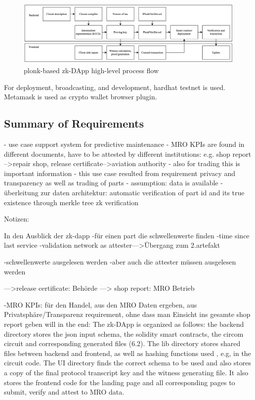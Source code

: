 \begin{figure}[hbt]
	\centering
		\includegraphics[width=1.0\textwidth]{Pictures/circom snarkj plonk process flow.png}
	\caption{plonk-based zk-DApp high-level process flow}
	\label{fig:zk-DAppgeneral}
\end{figure}

For deployment, broadcasting, and development, hardhat testnet is used. Metamask is used as crypto wallet browser plugin.

\subsection{Summary of Requirements}
- use case support system for predictive maintenance
- MRO KPIs are found in different documents, have to be attested by different institutions: e.g. shop report -->repair shop, release certificate-->aviation authority
- also for trading this is important information 
- this use case resulted from requirement privacy and transparency as well as trading of parts
- assumption: data is available
- überleitung zur daten architektur: automatic verification of part id and its true existence through merkle tree zk verification

Notizen:

In den Ausblick der zk-dapp
-für einen part die schwellenwerte finden
-time since last service
-validation network as attester—>Übergang zum 2.artefakt 

-schwellenwerte ausgelesen werden
-aber auch die attester müssen ausgelesen werden

—>release certificate: Behörde
—> shop report: MRO Betrieb

-MRO KPIs: für den Handel, aus den MRO Daten ergeben, aus Privatsphäre/Transparenz requirement, ohne dass man Einsicht ins gesamte shop report geben will
in the end:
The zk-DApp is organized as follows: the backend directory stores the json input schema, the solidity smart contracts, the circom circuit and corresponding generated files (6.2). The lib directory stores shared files between backend and frontend, as well as hashing functions used , e.g, in the circuit code. The UI directory finds the correct schema to be used and also stores a copy of the final protocol transcript key and the witness generating file. It also stores the frontend code for the landing page and all corresponding pages to submit, verify and attest to MRO data.

